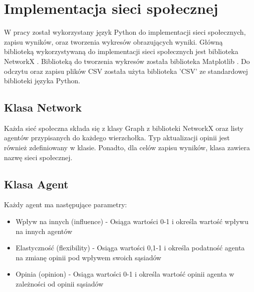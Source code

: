 \section{Implementacja sieci społecznej}
W pracy został wykorzystany język Python do implementacji sieci społecznych, zapisu wyników, oraz tworzenia wykresów obrazujących wyniki.
Główną biblioteką wykorzystywaną do implementacji sieci społecznych jest biblioteka NetworkX \cite{NetworkX}.
Biblioteką do tworzenia wykresów została biblioteka Matplotlib \cite{Matplotlib}.
Do odczytu oraz zapisu plików CSV została użyta biblioteka 'CSV' \cite{CSV} ze standardowej biblioteki języka Python.

\subsection{Klasa Network}

Każda sieć społeczna składa się z klasy Graph z biblioteki NetworkX \cite{NetworkX} oraz listy agentów przypisanych do każdego wierzchołka.
Typ aktualizacji opinii jest również zdefiniowany w klasie.
Ponadto, dla celów zapisu wyników, klasa zawiera nazwę sieci społecznej.

\subsection{Klasa Agent}

Każdy agent ma następujące parametry:
\begin{itemize}
    \item Wpływ na innych (influence) - Osiąga wartości 0-1 i określa wartość wpływu na innych agentów
    \item Elastyczność (flexibility) - Osiąga wartości 0,1-1 i określa podatność agenta na zmianę opinii pod wpływem swoich sąsiadów
    \item Opinia (opinion) - Osiąga wartości 0-1 i określa wartość opinii agenta w zależności od opinii sąsiadów
\end{itemize}